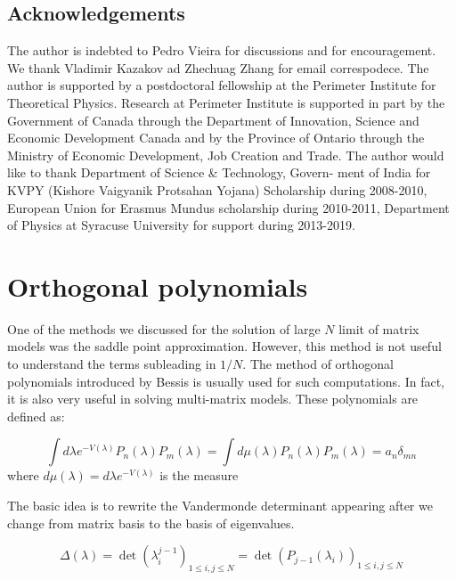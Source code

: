\documentclass[11pt]{article}
\begin{document}
\subsection*{Acknowledgements}
The author is indebted to Pedro Vieira
for discussions and for encouragement. We thank Vladimir Kazakov 
ad Zhechuag Zhang for email correspodece.
The author is supported by a postdoctoral fellowship at the Perimeter Institute for 
Theoretical Physics. Research at Perimeter Institute is supported 
in part by the Government of Canada through the Department of Innovation, Science and 
Economic Development Canada and by the Province of Ontario through 
the Ministry of Economic Development, Job Creation and Trade.
The author would like to thank Department of Science \& Technology, Govern-
ment of India for KVPY (Kishore Vaigyanik Protsahan Yojana) Scholarship during 2008-2010, 
European Union for Erasmus Mundus scholarship during 2010-2011, 
Department of Physics at Syracuse University for support during 2013-2019. 

\appendix



\section{Orthogonal polynomials}
One of the methods we discussed for the solution of 
large $N$ limit of matrix models was the saddle point approximation. 
However, this method is not useful 
to understand the terms subleading in $1/N$. The method 
of orthogonal polynomials introduced by Bessis \cite{Bessis:1979is} 
is usually used for such computations. In fact, it is also very useful in 
solving multi-matrix models. These polynomials are defined as:

\begin{equation}
	\label{eq:ortho_nn} 
	\int d\lambda e^{-V(\lambda)} P_{n}(\lambda)
	P_{m}(\lambda) = \int d \mu(\lambda) P_{n}(\lambda)
	P_{m}(\lambda) = a_{n} \delta_{mn} 
\end{equation}
where $d \mu(\lambda) = d\lambda e^{-V(\lambda)}$ is the measure  

The basic idea is to rewrite the Vandermonde determinant appearing after we change from matrix basis to the basis of eigenvalues. 

\begin{equation}
	\Delta(\lambda) = \det(\lambda_{i}^{j-1})_{1 \le i, j \le N} = \det(P_{j-1}(\lambda_i))_{1 \le i, j \le N}
\end{equation}
\end{document}
